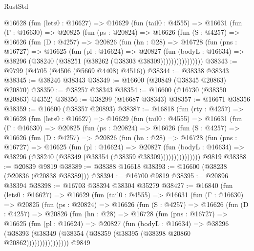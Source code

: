 \begin{lexlean}{RustStd}
\begin{coremodule}
      @16628
        (fun (lets0 : @16627) =>
        @16629
          (fun (tail0 : @4555) =>
          @16631
            (fun (Γ : @16630) =>
            @20825
              (fun (ps : @20824) =>
              @16626
                (fun (S : @4257) =>
                @16626
                  (fun (D : @4257) =>
                  @20826
                    (fun (hn : @28) =>
                    @16728
                      (fun (pns : @16727) =>
                      @16625
                        (fun (pl : @16624) =>
                        @20827
                          (fun (bodyL : @16634) =>
                          @38296 (@38240 (@38251 (@38262 (@38303 @38309))))))))))))))))
@38343 := @9799 (@4705 (@4506 (@5669 @4408) @4516))
@38344 := @38338 @38343
@38345 := @38246 @38343
@38349 := @16600 (@20849 (@38345 @20863) @20870)
@38350 := @38257 @38343
@38354 := @16600 (@16730 (@38350 @20863) @4352)
@38356 := @38299 (@16687 @38343)
@38357 := @16671 @38356
@38359 := @16600 (@38357 @20893)
@38387 := @16818
    (fun (rty : @4257) =>
    @16628
      (fun (lets0 : @16627) =>
      @16629
        (fun (tail0 : @4555) =>
        @16631
          (fun (Γ : @16630) =>
          @20825
            (fun (ps : @20824) =>
            @16626
              (fun (S : @4257) =>
              @16626
                (fun (D : @4257) =>
                @20826
                  (fun (hn : @28) =>
                  @16728
                    (fun (pns : @16727) =>
                    @16625
                      (fun (pl : @16624) =>
                      @20827
                        (fun (bodyL : @16634) =>
                        @38296 (@38240 (@38349 (@38354 (@38359 @38309)))))))))))))))
    @9819
@38388 := @20839 @9819
@38389 := @38388 @16618
@38393 := @16600 (@38238 (@20836 (@20838 @38389)))
@38394 := @16700 @9819
@38395 := @20896 @38394
@38398 := @16703 @38394 @38304 @35279
@38427 := @16840
    (fun (lets0 : @16627) =>
    @16629
      (fun (tail0 : @4555) =>
      @16631
        (fun (Γ : @16630) =>
        @20825
          (fun (ps : @20824) =>
          @16626
            (fun (S : @4257) =>
            @16626
              (fun (D : @4257) =>
              @20826
                (fun (hn : @28) =>
                @16728
                  (fun (pns : @16727) =>
                  @16625
                    (fun (pl : @16624) =>
                    @20827
                      (fun (bodyL : @16634) =>
                      @38296
                        (@38393
                          (@38349 (@38354 (@38359 (@38395 (@38398 @20860 @20862))))))))))))))))
    @9849

\end{coremodule}
\end{lexlean}
